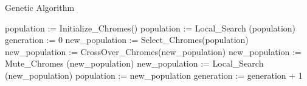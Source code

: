 \documentclass{article}
\begin{document}
\begin{algorithm} 
	\caption{Genetic Algorithm} 	
	\begin{algorithmic}
		\STATE population := Initialize\_Chromes()
		\STATE population :=  Local\_Search (population)
		\STATE generation := 0
		\STATE new\_population := Select\_Chromes(population)
		\STATE new\_population := CrossOver\_Chromes(new\_population)
		\STATE new\_population := Mute\_Chromes (new\_population)
		\STATE new\_population :=  Local\_Search (new\_population)
		\STATE population := new\_population
		\ENDIF
		\STATE generation := generation $+$ 1
		\ENDWHILE
	\end{algorithmic} 
\end{algorithm}
\end{document}

